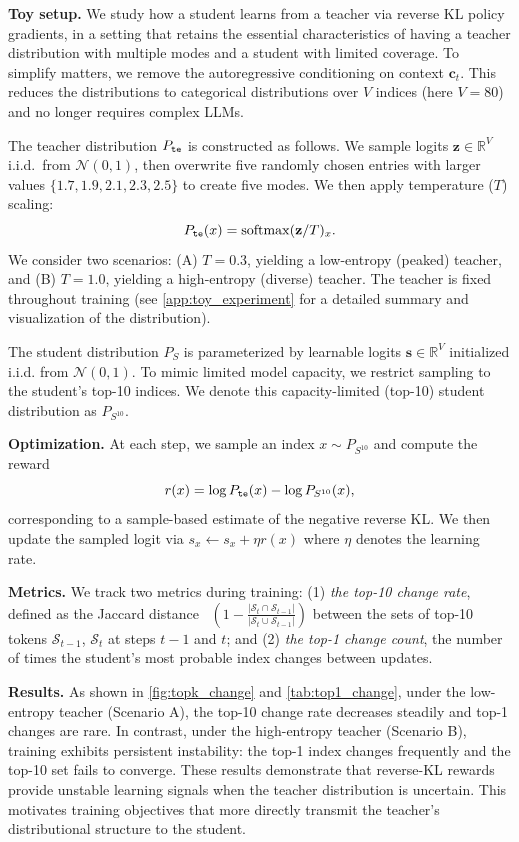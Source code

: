 \textbf{Toy setup.} We study how a student learns from a teacher via reverse KL policy gradients, in a setting that retains the essential characteristics of having a teacher distribution with multiple modes and a student with limited coverage. To simplify matters, we remove the autoregressive conditioning on context $\mathbf{c}_t$. This reduces the distributions to categorical distributions over $V$ indices (here $V = 80$) and no longer requires complex LLMs.

The teacher distribution $P_{\tt te}$ is constructed as follows. We sample logits $\mathbf{z}\in\mathbb{R}^V$ i.i.d.\ from $\mathcal{N}(0,1)$, then overwrite five randomly chosen entries with larger values $\{1.7, 1.9, 2.1, 2.3, 2.5\}$ to create five modes. We then apply temperature ($T$) scaling: 
\[
P_{\tt te}(x)=\mathrm{softmax}(\mathbf{z}/T)_x.
\]
We consider two scenarios: (A) $T=0.3$, yielding a low-entropy (peaked) teacher, and (B) $T=1.0$, yielding a high-entropy (diverse) teacher. The teacher is fixed throughout training (see \autoref{app:toy_experiment} for a detailed summary and visualization of the distribution).

The student distribution $P_S$ is parameterized by learnable logits $\mathbf{s}\in\mathbb{R}^V$ initialized i.i.d. from $\mathcal{N}(0,1)$. To mimic limited model capacity, we restrict sampling to the student's top-10 indices.
We denote this capacity-limited (top-10) student distribution as $P_{S^{10}}$.

\textbf{Optimization.} At each step, we sample an index $x\sim P_{S^{10}}$ and compute the reward 
\[
r(x) = \log P_{\tt{te}}(x) - \log P_{S^{10}}(x),
\]
corresponding to a sample-based estimate of the negative reverse KL. We then update the sampled logit via $s_x \leftarrow s_x + \eta r(x)$ where $\eta$ denotes the learning rate.

\textbf{Metrics.} We track two metrics during training: (1) {\em the top-10 change rate}, defined as the Jaccard distance~\cite{jaccard1901etude}
$\left(
1 - \frac{|\mathcal{S}_{t} \cap \mathcal{S}_{t-1}|}{|\mathcal{S}_{t} \cup \mathcal{S}_{t-1}|}
\right)$ between the sets of top-10 tokens $\mathcal{S}_{t-1}$, $\mathcal{S}_{t}$ at steps $t-1$ and $t$; and 
(2) {\em the top-1 change count}, the number of times the student's most probable index changes between updates.

\textbf{Results.} As shown in \autoref{fig:topk_change} and \autoref{tab:top1_change}, under the low-entropy teacher (Scenario A), the top-10 change rate decreases steadily and top-1 changes are rare. In contrast, under the high-entropy teacher (Scenario B), training exhibits persistent instability: the top-1 index changes frequently and the top-10 set fails to converge. These results demonstrate that reverse-KL rewards provide unstable learning signals when the teacher distribution is uncertain. This motivates training objectives that more directly transmit the teacher's distributional structure to the student.

